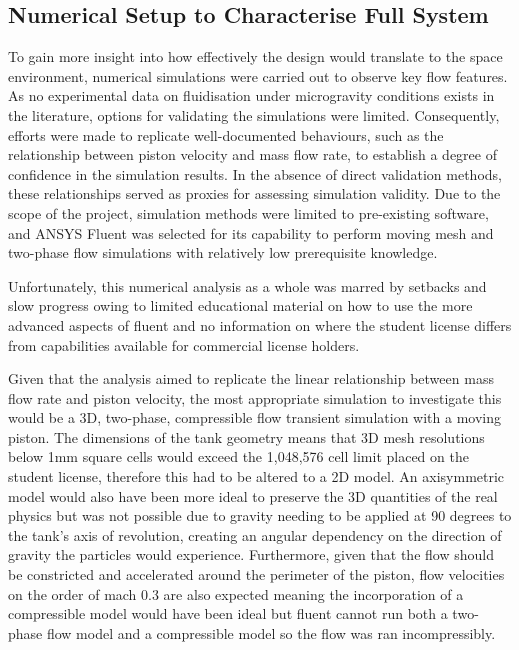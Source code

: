 \subsection{Numerical Setup to Characterise Full System}
To gain more insight into how effectively the design would translate to the space environment, numerical simulations were carried out to observe key flow features. As no experimental data on fluidisation under microgravity conditions exists in the literature, options for validating the simulations were limited. Consequently, efforts were made to replicate well-documented behaviours, such as the relationship between piston velocity and mass flow rate, to establish a degree of confidence in the simulation results. In the absence of direct validation methods, these relationships served as proxies for assessing simulation validity. Due to the scope of the project, simulation methods were limited to pre-existing software, and ANSYS Fluent was selected for its capability to perform moving mesh and two-phase flow simulations with relatively low prerequisite knowledge.

Unfortunately, this numerical analysis as a whole was marred by setbacks and slow progress owing to limited educational material on how to use the more advanced aspects of fluent and no information on where the student license differs from capabilities available for commercial license holders.

Given that the analysis aimed to replicate the linear relationship between mass flow rate and piston velocity, the most appropriate simulation to investigate this would be a 3D, two-phase, compressible flow transient simulation with a moving piston. The dimensions of the tank geometry means that 3D mesh resolutions below 1mm square cells would exceed the 1,048,576 cell limit placed on the student license, therefore this had to be altered to a 2D model. An axisymmetric model would also have been more ideal to preserve the 3D quantities of the real physics but was not possible due to gravity needing to be applied at 90 degrees to the tank's axis of revolution, creating an angular dependency on the direction of gravity the particles would experience. Furthermore, given that the flow should be constricted and accelerated around the perimeter of the piston, flow velocities on the order of mach 0.3 are also expected meaning the incorporation of a compressible model would have been ideal but fluent cannot run both a two-phase flow model and a compressible model so the flow was ran incompressibly.

